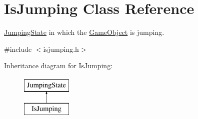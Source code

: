 \hypertarget{classIsJumping}{\section{Is\-Jumping Class Reference}
\label{classIsJumping}
}


\hyperlink{classJumpingState}{Jumping\-State} in which the \hyperlink{classGameObject}{Game\-Object} is jumping.  




{\ttfamily \#include $<$isjumping.\-h$>$}

Inheritance diagram for Is\-Jumping\-:\begin{figure}[H]
\begin{center}
\leavevmode
\includegraphics[height=2.000000cm]{classIsJumping}
\end{center}
\end{figure}
